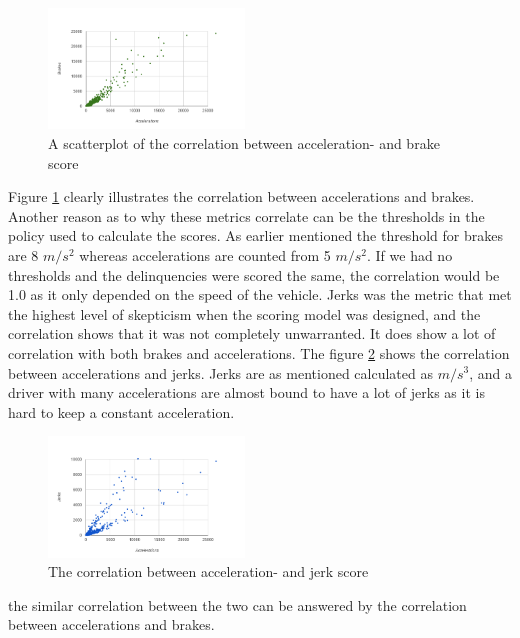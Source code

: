 \begin{figure}[tb]
\centering
\includegraphics[width=0.465\textwidth]{Pictures/abcorrel}
\caption{A scatterplot of the correlation between acceleration- and brake score}
\label{fig:abcorrel}
\end{figure}

Figure \ref{fig:abcorrel} clearly illustrates the correlation between accelerations and brakes. Another reason as to why these metrics correlate can be the thresholds in the policy used to calculate the scores. As earlier mentioned the threshold for brakes are 8 $m/s^2$ whereas accelerations are counted from 5 $m/s^2$. If we had no thresholds and the delinquencies were scored the same, the correlation would be 1.0 as it only depended on the speed of the vehicle. 
Jerks was the metric that met the highest level of skepticism when the scoring model was designed, and the correlation shows that it was not completely unwarranted. It does show a lot of correlation with both brakes and accelerations. The figure \ref{fig:ajcorrel} shows the correlation between accelerations and jerks. Jerks are as mentioned calculated as $m/s^3$, and a driver with many accelerations are almost bound to have a lot of jerks as it is hard to keep a constant acceleration.

\begin{figure}[tb]
\centering
\includegraphics[width=0.465\textwidth]{Pictures/ajcorrel}
\caption{The correlation between acceleration- and jerk score}
\label{fig:ajcorrel}
\end{figure}


the similar correlation between the two can be answered by the correlation between accelerations and brakes. 
